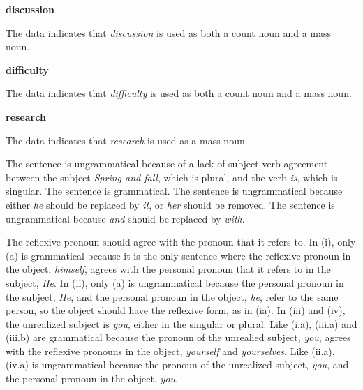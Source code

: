 \documentclass{article}
\begin{document}
\textbf{discussion}
\begin{exe}
\end{exe}
The data indicates that \textit{discussion} is used as both a count noun and a mass noun.

\textbf{difficulty}
\begin{exe}
\end{exe}
The data indicates that \textit{difficulty} is used as both a count noun and a mass noun.

\textbf{research}
\begin{exe}
\end{exe}
The data indicates that \textit{research} is used as a mass noun.
\clearpage

The sentence is ungrammatical because of a lack of subject-verb agreement between the subject \textit{Spring and fall}, which is plural, and the verb \textit{is},  which is singular.
The sentence is grammatical.
The sentence is ungrammatical because either \textit{he} should be replaced by \textit{it}, or \textit{her} should be removed.
The sentence is ungrammatical because \textit{and} should be replaced by \textit{with}.
\clearpage

The reflexive pronoun should agree with the pronoun that it refers to. In (i), only (a) is grammatical because it is the only sentence where the reflexive pronoun in the object, \textit{himself}, agrees with the personal pronoun that it refers to in the subject, \textit{He}. In (ii), only (a) is ungrammatical because the personal pronoun in the subject,  \textit{He}, and the personal pronoun in the object, \textit{he}, refer to the same person, so the object should have the reflexive form, as in (ia). In (iii) and (iv), the unrealized subject is \textit{you}, either in the singular or plural. Like (i.a), (iii.a) and (iii.b) are grammatical because the pronoun of the unrealied subject, \textit{you}, agrees with the reflexive pronouns in the object, \textit{yourself} and \textit{yourselves}. Like (ii.a), (iv.a) is ungrammatical because the pronoun of the unrealized subject, \textit{you}, and the personal pronoun in the object,  \textit{you}.
\end{document}

